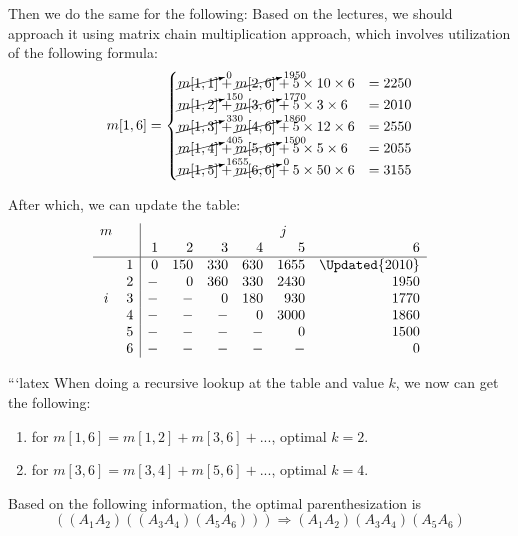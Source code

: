 Then we do the same for the following:
Based on the lectures, we should approach it using matrix chain multiplication
approach, which involves utilization of the following formula:
$$
    m[1, 6] =
    \begin{cases}
        \cancelto{0}{m[1, 1]}    + \cancelto{1950}{m[2, 6]} + 5 \times 10 \times 6  & = 2250 \\
        \cancelto{150}{m[1, 2]}  + \cancelto{1770}{m[3, 6]} + 5 \times  3 \times 6  & = 2010 \\
        \cancelto{330}{m[1, 3]}  + \cancelto{1860}{m[4, 6]} + 5 \times 12 \times 6  & = 2550 \\
        \cancelto{405}{m[1, 4]}  + \cancelto{1500}{m[5, 6]} + 5 \times  5 \times 6  & = 2055 \\
        \cancelto{1655}{m[1, 5]} + \cancelto{0}{m[6, 6]}    + 5 \times 50 \times 6  & = 3155
    \end{cases}
$$

After which, we can update the table:
\[
\begin{array}{cc|rrrrrr}
m &   & \multicolumn{6}{c}{j}                          \\
  &   &  1   &  2  &  3  &  4  &   5  &       6        \\
\hline
  & 1 &  0   & 150 & 330 & 630 & 1655 & \Updated{2010} \\
  & 2 &  -   &  0  & 360 & 330 & 2430 &     1950       \\
i & 3 &  -   &  -  &  0  & 180 &  930 &     1770       \\
  & 4 &  -   &  -  &  -  &  0  & 3000 &     1860       \\
  & 5 &  -   &  -  &  -  &  -  &   0  &     1500       \\
  & 6 &  -   &  -  &  -  &  -  &   -  &       0
\end{array}
\]

```latex
When doing a recursive lookup at the table and value $k$, we now can get the following:
\begin{enumerate}
    \item for $m[1, 6] = m[1, 2] + m[3, 6] + ...$, optimal $k = 2$.
    \item for $m[3, 6] = m[3, 4] + m[5, 6] + ...$, optimal $k = 4$.
\end{enumerate}

Based on the following information, the optimal parenthesization is
\[
    ((A_1 A_2)((A_3 A_4)(A_5 A_6))) \Rightarrow (A_1 A_2)(A_3 A_4)(A_5 A_6)
\]
